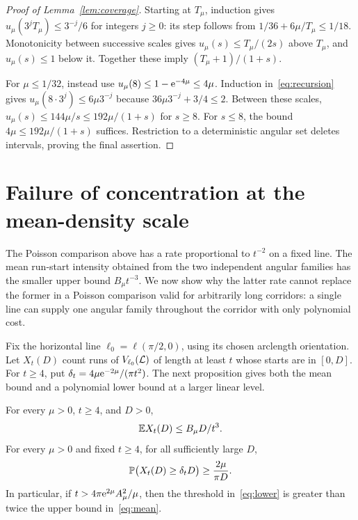 \documentclass[11pt,letterpaper]{article}
\begin{document}
\begin{proof}[Proof of Lemma~\ref{lem:coverage}]
Starting at $T_\mu$, induction gives $u_\mu(3^jT_\mu)\le3^{-j}/6$ for integers $j\ge0$: its step follows from $1/36+6\mu/T_\mu\le1/18$. Monotonicity between successive scales gives $u_\mu(s)\le T_\mu/(2s)$ above $T_\mu$, and $u_\mu(s)\le1$ below it. Together these imply $(T_\mu+1)/(1+s)$.

For $\mu\le1/32$, instead use $u_\mu(8)\le1-\e^{-4\mu}\le4\mu$. Induction in~\eqref{eq:recursion} gives $u_\mu(8\cdot3^j)\le6\mu3^{-j}$ because $36\mu3^{-j}+3/4\le2$. Between these scales, $u_\mu(s)\le144\mu/s\le192\mu/(1+s)$ for $s\ge8$. For $s\le8$, the bound $4\mu\le192\mu/(1+s)$ suffices. Restriction to a deterministic angular set deletes intervals, proving the final assertion.
\end{proof}

\section{Failure of concentration at the mean-density scale}

The Poisson comparison above has a rate proportional to $t^{-2}$ on a fixed line. The mean run-start intensity obtained from the two independent angular families has the smaller upper bound $B_\mu t^{-3}$. We now show why the latter rate cannot replace the former in a Poisson comparison valid for arbitrarily long corridors: a single line can supply one angular family throughout the corridor with only polynomial cost.

Fix the horizontal line $\ell_0=\ell(\pi/2,0)$, using its chosen arclength orientation. Let $X_t(D)$ count runs of $V_{\ell_0}(\cL)$ of length at least $t$ whose starts are in $[0,D]$. For $t\ge4$, put $\delta_t=4\mu\e^{-2\mu}/(\pi t^2)$. The next proposition gives both the mean bound and a polynomial lower bound at a larger linear level.

\begin{proposition}\label{prop:obstruction}
For every $\mu>0$, $t\ge4$, and $D>0$,
\begin{equation}\label{eq:mean}
 \E X_t(D)\le B_\mu D/t^3.
\end{equation}
For every $\mu>0$ and fixed $t\ge4$, for all sufficiently large $D$,
\begin{equation}\label{eq:lower}
 \P\big(X_t(D)\ge\delta_tD\big)\ge\frac{2\mu}{\pi D}.
\end{equation}
In particular, if $t>4\pi\e^{2\mu}A_\mu^2/\mu$, then the threshold in~\eqref{eq:lower} is greater than twice the upper bound in~\eqref{eq:mean}.
\end{proposition}
\end{document}
